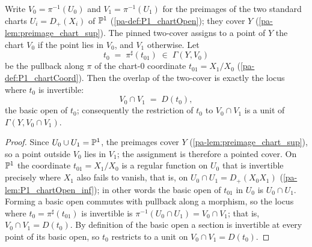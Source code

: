 \begin{definition}
  \label{pa-def:fiberCover}
  \leanok

  Write \(V_0 = \pi^{-1}(U_0)\) and \(V_1 = \pi^{-1}(U_1)\) for the preimages of the two standard
  charts \(U_i = D_+(X_i)\) of \(\mathbb{P}^1\) (\ref{pa-def:P1_chartOpen}); they cover \(Y\)
  (\ref{pa-lem:preimage_chart_sup}). The pinned two-cover assigns to a point of \(Y\) the chart \(V_0\)
  if the point lies in \(V_0\), and \(V_1\) otherwise. Let
  \[
    t_0 \;=\; \pi^{\sharp}(t_{01}) \;\in\; \Gamma(Y, V_0)
  \]
  be the pullback along \(\pi\) of the chart-\(0\) coordinate \(t_{01} = X_1/X_0\)
  (\ref{pa-def:P1_chartCoord}). Then the overlap of the two-cover is exactly the locus where \(t_0\) is
  invertible:
  \[
    V_0 \cap V_1 \;=\; D(t_0),
  \]
  the basic open of \(t_0\); consequently the restriction of \(t_0\) to \(V_0 \cap V_1\) is a unit of
  \(\Gamma(Y, V_0 \cap V_1)\).
\end{definition}
\begin{proof}
  \leanok
  Since \(U_0 \cup U_1 = \mathbb{P}^1\), the preimages cover \(Y\) (\ref{pa-lem:preimage_chart_sup}), so a
  point outside \(V_0\) lies in \(V_1\); the assignment is therefore a pointed cover. On \(\mathbb{P}^1\)
  the coordinate \(t_{01} = X_1/X_0\) is a regular function on \(U_0\) that is invertible precisely
  where \(X_1\) also fails to vanish, that is, on \(U_0 \cap U_1 = D_+(X_0 X_1)\)
  (\ref{pa-lem:P1_chartOpen_inf}); in other words the basic open of \(t_{01}\) in \(U_0\) is
  \(U_0 \cap U_1\). Forming a basic open commutes with pullback along a morphism, so the locus where
  \(t_0 = \pi^{\sharp}(t_{01})\) is invertible is \(\pi^{-1}(U_0 \cap U_1) = V_0 \cap V_1\); that is,
  \(V_0 \cap V_1 = D(t_0)\). By definition of the basic open a section is invertible at every point
  of its basic open, so \(t_0\) restricts to a unit on \(V_0 \cap V_1 = D(t_0)\).
\end{proof}

